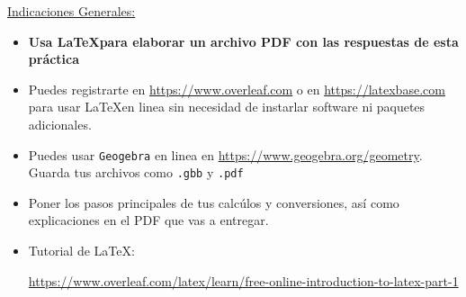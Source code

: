 \documentclass[addpoints,12pt]{exam}
\begin{document}
\underline{Indicaciones Generales:}
\begin{itemize}
\item {\bf Usa \LaTeX para elaborar un archivo PDF con las respuestas de 
 esta práctica}
\item Puedes registrarte en
\url{https://www.overleaf.com} o en \url{https://latexbase.com} para usar 
\LaTeX en linea sin necesidad de instarlar software ni paquetes adicionales. 
\item Puedes usar {\tt Geogebra} en linea en 
 \url{https://www.geogebra.org/geometry}. Guarda tus archivos como {\tt .gbb} 
 y {\tt .pdf}
\item Poner los pasos principales de tus calcúlos y conversiones, así como
explicaciones en el PDF que vas a entregar.
\item Tutorial de \LaTeX:

\url{https://www.overleaf.com/latex/learn/free-online-introduction-to-latex-part-1}
\end{itemize}
\end{document}
